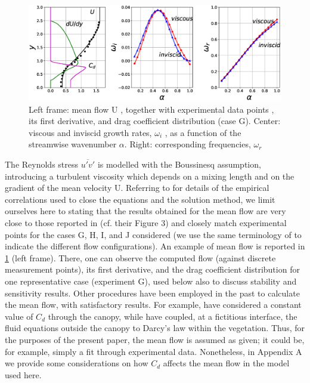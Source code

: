 \begin{figure}[h]
	\centering
	\includegraphics[width=1\linewidth]{chapter_3/figure/2}
	\caption{Left frame: mean flow U , together with experimental data points \citet{ghisalberti2004limited},  its first derivative, and drag coefficient
		distribution (case G). Center: viscous and inviscid growth rates, $\omega_i$ , as a function of the streamwise wavenumber $\alpha$. Right:
		corresponding frequencies, $\omega_r$}
	\label{fig:2}
\end{figure}



The Reynolds stress $\overline{u'v'}$ is modelled with
the Boussinesq assumption, introducing a turbulent viscosity which depends on a mixing length and
on the gradient of the mean velocity U. Referring to \citet{ghisalberti2004limited} for details of the empirical
correlations used to close the equations and the solution method, we limit ourselves here to stating
that the results obtained for the mean flow are very close to those reported in \citet{zampogna2016instability} (cf.
their Figure 3) and closely match experimental points for the cases G, H, I, and J considered (we use
the same terminology of\citet{ghisalberti2002mixing} \citet{ghisalberti2004limited} \citet{ghisalberti2005mass} to indicate the different flow configurations). An
example of mean flow is reported in \ref{fig:2} (left frame). There, one can observe the computed flow
(against discrete measurement points), its first derivative, and the drag coefficient distribution for one
representative case (experiment G), used below also to discuss stability and sensitivity results.
Other procedures have been employed in the past to calculate the mean flow, with satisfactory
results. For example,\citet{singh2016linear} have considered a constant value of $C_d$ through the canopy, while
\citet{zampogna2016instability} have coupled, at a fictitious interface, the fluid equations outside the canopy
to Darcy’s law within the vegetation. Thus, for the purposes of the present paper, the mean flow is
assumed as given; it could be, for example, simply a fit through experimental data. Nonetheless, in
Appendix A we provide some considerations on how $C_d$ affects the mean flow in the model used here.



